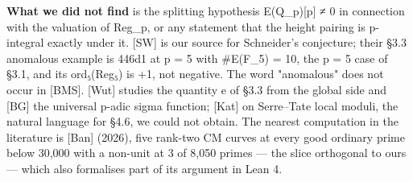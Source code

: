 \documentclass[11pt,a4paper]{article}
\theoremstyle{named}
\begin{document}
\textbf{What we did not find} is the splitting hypothesis E(Q\_p)[p] ≠ 0 in connection with the valuation of Reg\_p, or any statement that the height pairing is p-integral exactly under it. [SW] is our source for Schneider's conjecture; their §3.3 anomalous example is 446d1 at p = 5 with \#E(F\_5) = 10, the p = 5 case of §3.1, and its ord₅(Reg₅) is +1, not negative. The word "anomalous" does not occur in [BMS]. [Wut] studies the quantity e of §3.3 from the global side and [BG] the universal p-adic sigma function; [Kat] on Serre–Tate local moduli, the natural language for §4.6, we could not obtain. The nearest computation in the literature is [Ban] (2026), five rank-two CM curves at every good ordinary prime below 30,000 with a non-unit at 3 of 8,050 primes — the slice orthogonal to ours — which also formalises part of its argument in Lean 4.
\end{document}

